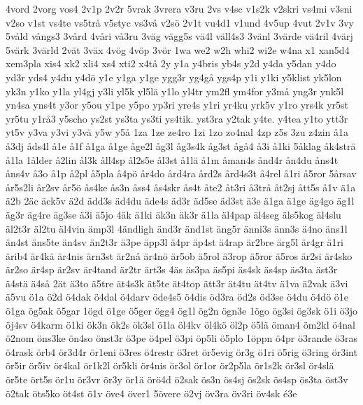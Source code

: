 {{4vord
2vorg
vos4
2v1p
2v2r
5vrak
3vrera
v3ru
2vs
v4sc
v1s2k
v2skri
vs4mi
v3sni
v2so
v1st
vs4te
vs5tr^^e5
v5styc
vs3v^^e5
v2s^^f6
2v1t
vu4d1
v1und
4v5up
4vut
2v1v
3vy
5v^^e5ld
v^^e5ngs3
3v^^e5rd
4v^^e5ri
v^^e53ru
3v^^e4g
v^^e4gg5s
v^^e44l
v^^e4ll4s3
3v^^e4nl
3v^^e4rde
v^^e44ril
4v^^e4rj
5v^^e4rk
3v^^e4rld
2v^^e4t
3v^^e4x
4v^^f6g
4v^^f6p
3v^^f6r
1wa
we2
w2h
whi2
wi2e
w4na
x1
xan5d4
xem3pla
xis4
xk2
xli4
xs4
xti2
x4t^^e5
2y
y1a
y4bris
yb4s
y2d
y4da
y5dan
y4do
yd3r
yds4
y4du
y4d^^f6
y1e
y1ga
y1ge
ygg3r
yg4g^^e5
ygs4p
y1i
y1ki
y5klist
yk5lon
yk3n
y1ko
y1la
yl4gj
y3li
yl5k
yl5l^^e4
y1lo
yl4tr
ym2fl
ym4for
y3m^^e5
yng3r
ynk5l
yn4sa
yns4t
y3or
y5ou
y1pe
y5po
yp3ri
yre4s
y1ri
yr4ku
yrk5v
y1ro
yrs4k
yr5st
yr5tu
y1r^^e53
y5scho
ys2st
ys3ta
ys3ti
ys4tik.
yst3ra
y2tak
y4te.
y4tea
y1to
ytt3r
yt5v
y3va
y3vi
y3v^^e4
y5w
y5^^e5
1za
1ze
ze4ro
1zi
1zo
zo4nal
4zp
z5s
3zu
z4zin
^^e51a
^^e53dj
^^e5ds4l
^^e51e
^^e51f
^^e51ga
^^e51ge
^^e5ge2l
^^e5g3l
^^e5g3s4k
^^e5g3st
^^e5g^^e54
^^e53i
^^e51ki
5^^e5klag
^^e5k4str^^e4
^^e51la
1^^e5lder
^^e52lin
^^e5l3k
^^e5ll4sp
^^e5l2s5e
^^e5l3st
^^e51l^^e4
^^e51m
^^e5man4s
^^e5nd4r
^^e5n4du
^^e5ns4t
^^e5ns4v
^^e53o
^^e51p
^^e52pl
^^e55pla
^^e54p^^f6
^^e5r4do
^^e5rd4ra
^^e5rd2s
^^e5rd4s3t
^^e54rel
^^e51ri
^^e55ror
5^^e5rsav
^^e5r5s2li
^^e5r2sv
^^e5r5^^f6
^^e5s4ke
^^e5s3n
^^e5ss4
^^e5s4skr
^^e5s4t
^^e5te2
^^e5t3ri
^^e53tr^^e5
^^e5t2sj
^^e5tt5s
^^e51v
^^e41a
^^e42b
2^^e4c
^^e4ck5v
^^e42d
^^e4dd3s
^^e4d4du
^^e4de4s
^^e4d3r
^^e4d5se
^^e4d3st
^^e43e
^^e41ga
^^e41ge
^^e4g4go
^^e4g1l
^^e4g3r
^^e4g4re
^^e4g3se
^^e43i
^^e45jo
4^^e4k
^^e41ki
^^e4k3n
^^e4k3r
^^e41la
^^e4l4pap
^^e4l4seg
^^e4ls5kog
^^e4l4slu
^^e4l2t3r
^^e4l2tu
^^e4l4vin
^^e4mp3l
4^^e4ndligh
^^e4nd3r
^^e4nd1st
^^e4ng5r
^^e4nni3s
^^e4nn3s
^^e44no
^^e4ns1l
^^e4n4st
^^e4ns5te
^^e4n4sv
^^e4n2t3r
^^e43pe
^^e4pp3l
^^e44pr
^^e4p4st
^^e44rap
^^e4r2bre
^^e4rg5l
^^e4r4gr
^^e41ri
^^e4rib4
^^e4r4k^^e4
^^e4r4nis
^^e4rn3st
^^e4r2n^^e5
^^e4r4n^^f6
^^e4r5ob
^^e45rol
^^e43rop
^^e45ror
^^e45ros
^^e4r2si
^^e4r4sko
^^e4r2so
^^e4r4sp
^^e4r2sv
^^e4r4tand
^^e4r2tr
^^e4rt3s
4^^e4s
^^e4s3pa
^^e4s5pi
^^e4s4sk
^^e4s4sp
^^e4s3ta
^^e4st3r
^^e44st^^e4
^^e44s^^e5
2^^e4t
^^e43to
^^e45tre
^^e4t4s3k
^^e4t5te
^^e4t4top
^^e4tt3r
^^e4t4tu
^^e4t4tv
^^e41va
^^e42vak
^^e43vi
^^e45vu
^^f61a
^^f62d
^^f64dak
^^f64dal
^^f64darv
^^f6de4s5
^^f64dis
^^f6d3ra
^^f6d2s
^^f6d3se
^^f64du
^^f64d^^f6
^^f61e
^^f61ga
^^f6g5ak
^^f65gar
1^^f6gd
^^f61ge
^^f65ger
^^f6gg4
^^f6g1l
^^f6g2n
^^f6gn3e
1^^f6go
^^f6g3si
^^f6g3sk
^^f61i
^^f63jo
^^f6j4sv
^^f64karm
^^f61ki
^^f6k3n
^^f6k2s
^^f6k3sl
^^f61la
^^f6l4kv
^^f6l4k^^f6
^^f6l2p
^^f65l^^e4
^^f6man4
^^f6m2kl
^^f64nal
^^f62nom
^^f6ns3ke
^^f6n4so
^^f6nst3r
^^f63pe
^^f64pel
^^f63pi
^^f6p5li
^^f65plo
1^^f6ppn
^^f64pr
^^f63rande
^^f63ras
^^f64rask
^^f6rb4
^^f6r3d4r
^^f6r1eni
^^f63res
^^f64restr
^^f63ret
^^f6r5evig
^^f6r3g
^^f61ri
^^f65rig
^^f63ring
^^f6r3int
^^f6r5ir
^^f6r5iv
^^f6r4kal
^^f6r1k2l
^^f6r5kli
^^f6r4nis
^^f6r3ol
^^f6r1or
^^f6r2p5la
^^f6r1s2k
^^f6r3sl
^^f6r4sl^^e4
^^f6r5te
^^f6rt5s
^^f6r1u
^^f6r3vr
^^f6r3y
^^f6r1^^e4
^^f6r^^f64d
^^f62sak
^^f6s3n
^^f6s4sj
^^f6s2sk
^^f6s4sp
^^f6s3ta
^^f6st3v
^^f62tak
^^f6ts5ko
^^f6t4st
^^f61v
^^f6ve4
^^f6ver1
5^^f6vere
^^f62vj
^^f6v3ra
^^f6v3ri
^^f6v4sk
^^e93e
}
}